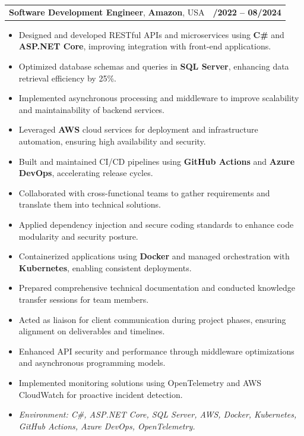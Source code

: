 \documentclass[letterpaper,11pt]{article}
\makeatletter
\newcommand{\resumeItem}[1]{
  \item\footnotesize{
    {#1 \vspace{-2pt}}
  }
}
\newcommand{\resumeSubheading}[4]{
  \vspace{-2pt}\item
    \begin{tabular*}{1.0\textwidth}[t]{l@{\extracolsep{\fill}}r}
      \textbf{\fontsize{10pt}{14pt}\selectfont #3}, \textbf{\fontsize{10pt}{14pt}\selectfont #1}, \fontsize{10pt}{14pt}\selectfont #4 & \textbf{\fontsize{10pt}{14pt}\selectfont #2} \\
    \end{tabular*}\vspace{-7pt}
}
\newcommand{\resumeItemListStart}{\begin{itemize}[leftmargin=*]}
\newcommand{\resumeItemListEnd}{\end{itemize}\vspace{-5pt}}
\makeatother
\begin{document}
\resumeSubheading
{Amazon}{10/2022 -- 08/2024}
{Software Development Engineer}{USA}
\resumeItemListStart
  \resumeItem{Designed and developed RESTful APIs and microservices using \textbf{C\#} and \textbf{ASP.NET Core}, improving integration with front-end applications.}
  \resumeItem{Optimized database schemas and queries in \textbf{SQL Server}, enhancing data retrieval efficiency by 25\%.}
  \resumeItem{Implemented asynchronous processing and middleware to improve scalability and maintainability of backend services.}
  \resumeItem{Leveraged \textbf{AWS} cloud services for deployment and infrastructure automation, ensuring high availability and security.}
  \resumeItem{Built and maintained CI/CD pipelines using \textbf{GitHub Actions} and \textbf{Azure DevOps}, accelerating release cycles.}
  \resumeItem{Collaborated with cross-functional teams to gather requirements and translate them into technical solutions.}
  \resumeItem{Applied dependency injection and secure coding standards to enhance code modularity and security posture.}
  \resumeItem{Containerized applications using \textbf{Docker} and managed orchestration with \textbf{Kubernetes}, enabling consistent deployments.}
  \resumeItem{Prepared comprehensive technical documentation and conducted knowledge transfer sessions for team members.}
  \resumeItem{Acted as liaison for client communication during project phases, ensuring alignment on deliverables and timelines.}
  \resumeItem{Enhanced API security and performance through middleware optimizations and asynchronous programming models.}
  \resumeItem{Implemented monitoring solutions using OpenTelemetry and AWS CloudWatch for proactive incident detection.}
  \resumeItem{\textit{Environment: C\#, ASP.NET Core, SQL Server, AWS, Docker, Kubernetes, GitHub Actions, Azure DevOps, OpenTelemetry.}}
\resumeItemListEnd
\end{document}
